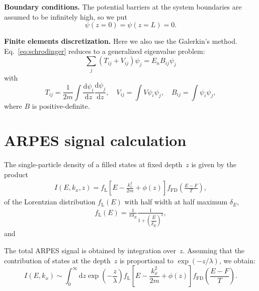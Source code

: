 \documentclass[10pt]{article}
\newcommand{\dd}{\mathrm{d}}
\begin{document}
\textbf{Boundary conditions.} The potential barriers at the system
boundaries are assumed to be infinitely high, so we put
\begin{equation}
	\psi(z = 0) = \psi(z = L) = 0.
\end{equation}

\textbf{Finite elements discretization.} Here we also use the Galerkin's method.
Eq.~\eqref{eq:schrodinger} reduces to a generalized eigenvalue problem:
\begin{equation}
	\sum_j \left( T_{ij} + V_{ij} \right) \psi_j = E_n B_{ij} \psi_j
\end{equation}
with
\begin{equation}
	T_{ij} = \frac{1}{2m }\int \frac{\dd \psi_i}{\dd z} \frac{\dd \psi_j}{\dd z}, \quad
	V_{ij} = \int V \psi_i \psi_j, \quad B_{ij} = \int \psi_i \psi_j,
\end{equation}
where $B$ is positive-definite.

\section{ARPES signal calculation}

The single-particle density of a filled states at fixed depth~$z$ is given by
the product
\begin{eqnarray}
	I(E, k_x, z) = f_{\mathrm{L}}\left[ E - \frac{k_x^2}{2m} + \phi(z) \right]
				   f_{\mathrm{FD}}\left( \frac{E - F}{T} \right),
\end{eqnarray}
of the Lorentzian distribution $f_{\mathrm{L}}(E)$ with half width at half
maximum $\delta_E$,
\begin{eqnarray}
	f_{\mathrm{L}}(E) = \frac{1}{\pi \delta_E}
		\frac{1}{1 + \left( \dfrac{E}{\delta_E} \right)^2},
\end{eqnarray}
and

The total ARPES signal is obtained by integration over~$z$. Assuming that the
contribution of states at the depth~$z$ is proportional to $\exp(-z / \lambda)$,
we obtain:
\begin{equation}
	I(E, k_x) \sim \int_0^\infty \dd z \exp\left( -\frac{z}{\lambda} \right)
				f_{\mathrm{L}}\left[ E - \frac{k_x^2}{2m} + \phi(z) \right]
				f_{\mathrm{FD}}\left( \frac{E - F}{T} \right).
\end{equation}
\end{document}
